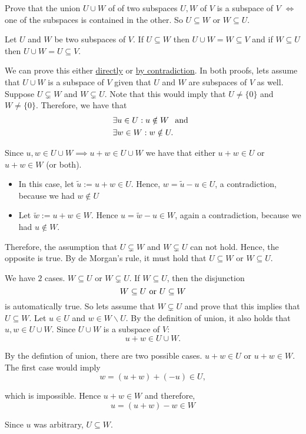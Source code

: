 \setcounter{xrcscount}{11}
\begin{xrcs}
  Prove that the union $U \cup W$ of of two subspaces $U, W$ of $V$ is a subspace of $V$ $\iff$ one of the subspaces is contained in the other. So $U\subseteq W$ or $W \subseteq U$.

  \begin{xprf}
    \Leftarrowdirection Let $U$ and $W$ be two subspaces of $V$. If $U \subseteq W$ then $U \cup W = W \subseteq V$ and if $W \subseteq U$ then $U \cup W = U \subseteq V$.

    \Rightarrowdirection We can prove this either \underline{directly} or \underline{by contradiction}. In both proofs, lets assume that $U \cup W$ is a subspace of $V$ given that $U$ and $W$ are subspaces of $V$ as well. \\
     Suppose $U \subsetneq W$ and $W \subsetneq U$. Note that this would imply that $U \neq \{0\}$ and $W \neq \{0\}$. Therefore, we have that
    \[
    \begin{aligned}
      &\exists u \in U: u \notin W \;\;\, \text{and}\;\; \\
      &\exists w \in W: w \notin U.
    \end{aligned}
    \]

    Since $u,w \in U \cup W \implies u+w \in U \cup W $ we have that either $u+w \in U$ or $u+w \in W$ (or both).

    \begin{itemize}
      \item {} In this case, let $\widetilde{u} := u + w \in U$. Hence, $w = \widetilde{u} - u \in U$, a contradiction, because we had $w \notin U$
      \item {} Let $\widetilde w := u + w \in W$. Hence $u = \widetilde{w} - u \in W$, again a contradiction, because we had $u \notin W$.
    \end{itemize}

    Therefore, the assumption that $U \subsetneq W$ and $W \subsetneq U$ can not hold. Hence, the opposite is true. By de Morgan's rule, it must hold that $U \subseteq W$ or $W \subseteq U$.

     We have $2$ cases. $W \subseteq U$ or $W \subsetneq U$. If $W \subseteq U$, then the disjunction \[
    W \subseteq U $ or $ U \subseteq W
    \]
    is automatically true. So lets assume that $W \subsetneq U$ and prove that this implies that $U \subseteq W$.
    Let $u \in U$ and $w \in W \backslash U$. By the definition of union, it also holds that $u,w \in U \cup W$. Since $U \cup W$ is a subspace of $V$:
    \[
    u+w \in U \cup W.
    \]

    By the defintion of union, there are two possible cases. $u+w \in U$ or $u+w \in W$. The first case would imply
    \[
    w = (u+w) + (-u) \in U,
    \]

    which is impossible. Hence $u+w \in W$ and therefore,
    \[
    u= (u+w) -w \in W
    \]

    Since $u$ was arbitrary, $U \subseteq W$.
  \end{xprf}
\end{xrcs}


